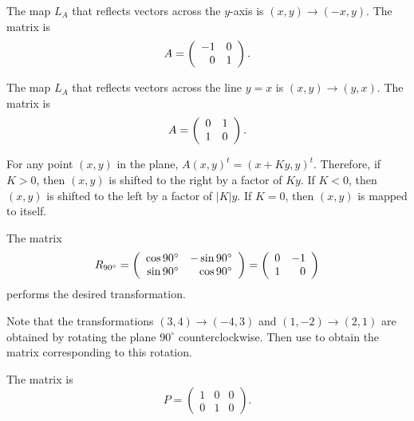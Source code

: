  The map $L_A$ that reflects vectors across the $y$-axis is
$(x,y) \rightarrow (-x,y)$.  The matrix is
\[
A = \left(\begin{array}{rr} -1 & 0\\ 0 &1\end{array}\right).
\]

 The map $L_A$ that reflects vectors across the line $y=x$ is
$(x,y) \rightarrow (y,x)$.  The matrix is
\[
A = \left(\begin{array}{rr} 0 & 1\\ 1 &0\end{array}\right).
\]

For any point $(x,y)$ in the plane, $A(x,y)^t = (x + Ky,y)^t$.  Therefore,
if $K > 0$, then $(x,y)$ is shifted to the right by a factor of $Ky$.  If
$K < 0$, then $(x,y)$ is shifted to the left by a factor of $|K|y$.  If
$K = 0$, then $(x,y)$ is mapped to itself.

\ans The matrix
\[ R_{90^\circ} = \left(\begin{array}{rr} \cos{90^\circ} & -\sin{90^\circ}\\ \sin{90^\circ} &\cos{90^\circ}\end{array}\right) = \left(\begin{array}{rr} 0 & -1\\ 1 &0\end{array}\right) \]
performs the desired transformation.

\soln Note that the transformations $(3,4) \rightarrow (-4,3)$ and
$(1,-2) \rightarrow (2,1)$ are obtained by rotating the plane
$90^\circ$ counterclockwise.  Then use  to obtain the
matrix corresponding to this rotation.

\ans The matrix is
\[ P = \left(\begin{array}{rrr} 1 & 0 & 0 \\ 0 & 1 & 0\end{array}\right). \]

